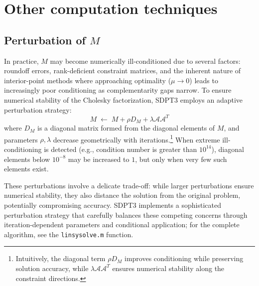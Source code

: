 \section{Other computation techniques}\label{sec:other_computation}
\subsection{Perturbation of \boldmath $M$ }
In practice, $M$ may become numerically ill-conditioned due to several factors: roundoff errors, rank-deficient constraint matrices, and the inherent nature of interior-point methods where approaching optimality ($\mu \to 0$) leads to increasingly poor conditioning as complementarity gaps narrow.
To ensure numerical stability of the Cholesky factorization, SDPT3 employs an adaptive perturbation strategy:
\[
  M \;\leftarrow\; M + \rho D_M + \lambda \mathcal{A}\mathcal{A}^T
\]
where $D_M$ is a diagonal matrix formed from the diagonal elements of $M$, and parameters $\rho, \lambda$ decrease geometrically with iterations.\footnote{
  Intuitively, the diagonal term $\rho D_M$ improves conditioning while preserving solution accuracy, while $\lambda \mathcal{A}\mathcal{A}^T$ ensures numerical stability along the constraint directions.
}
When extreme ill-conditioning is detected (e.g., condition number is greater than $10^{14}$), diagonal elements below $10^{-8}$ may be increased to $1$, but only when very few such elements exist.

These perturbations involve a delicate trade-off: while larger perturbations ensure numerical stability, they also distance the solution from the original problem, potentially compromising accuracy. SDPT3 implements a sophisticated perturbation strategy that carefully balances these competing concerns through iteration-dependent parameters and conditional application; for the complete algorithm, see the \texttt{linsysolve.m} function.


